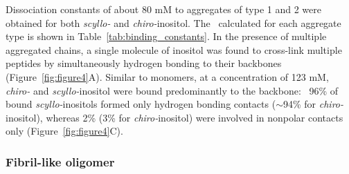 Dissociation constants of about 80 mM to aggregates of type 1 and 2 were obtained for both \textit{scyllo-} and \textit{chiro-}inositol. The \KD\  calculated for each aggregate type is shown in Table~\ref{tab:binding_constants}. In the presence of multiple aggregated chains, a single molecule of inositol was found to cross-link multiple peptides by simultaneously hydrogen bonding to their backbones (Figure~\ref{fig:figure4}A). Similar to monomers, at a concentration of 123 mM, \textit{chiro-} and \textit{scyllo-}inositol were bound predominantly to the backbone: ~96\% of bound \textit{scyllo-}inositols formed only hydrogen bonding contacts ($\sim$94\% for \textit{chiro-}inositol), whereas 2\% (3\% for \textit{chiro-}inositol) were involved in nonpolar contacts only (Figure~\ref{fig:figure4}C).

\subsubsection{Fibril-like oligomer} %

